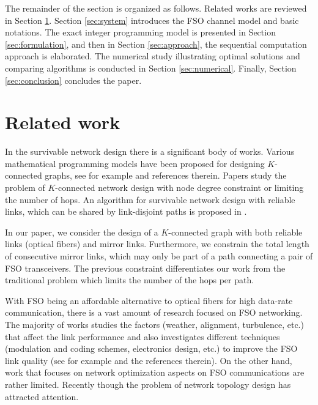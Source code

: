 \documentclass[onecolumn,11pt,draftclsnofoot]{IEEEtran}
\begin{document}
The remainder of the section is organized as follows. Related works are reviewed in Section \ref{sec:relate}.  Section \ref{sec:system} introduces the FSO channel model and basic notations. The exact integer programming model is presented in Section \ref{sec:formulation}, and then in Section \ref{sec:approach}, the sequential computation approach is elaborated. The numerical study illustrating optimal solutions and comparing algorithms is conducted in Section \ref{sec:numerical}. Finally, Section \ref{sec:conclusion} concludes the paper.

\section{Related work} \label{sec:relate}
In the survivable network design there is a significant body of works. Various mathematical programming models have been proposed for designing $K$-connected graphs, see for example
\cite{Kerivin2005} and references therein. Papers \cite{Khandekar2013,Bendali2010,Botton2013} study the problem of $K$-connected network design with node degree constraint or limiting the number of hops. An algorithm for survivable network design with reliable links, which can be shared by link-disjoint paths is proposed in \cite{Zotkiewicz2010}.

In our paper, we consider the design of a $K$-connected graph with both reliable links (optical fibers) and mirror links. Furthermore, we constrain the total length of consecutive mirror links, which may only be part of a path connecting a pair of FSO transceivers. The previous constraint differentiates our work from the traditional problem which limits the number of the hops per path.

With FSO being an affordable alternative to optical fibers for high data-rate communication,  there is a vast amount of research focused on FSO networking. The majority of works studies the factors (weather, alignment, turbulence, etc.) that affect the link performance and also investigates different techniques (modulation and coding schemes, electronics design, etc.) to improve the FSO link quality (see for example \cite{Borah2012} and the references therein). On the other hand, work that focuses on network optimization aspects on FSO communications are rather limited. Recently though the problem of network topology design has attracted attention.
\end{document}
